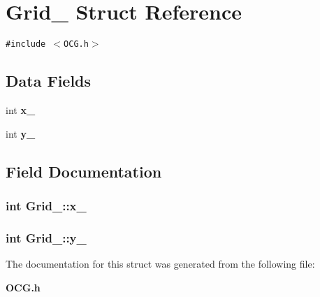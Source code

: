 \section{Grid\_\- Struct Reference}
\label{structGrid__}
{\tt \#include $<$OCG.h$>$}

\subsection*{Data Fields}
\begin{CompactItemize}
\item 
int {\bf x\_\-}
\item 
int {\bf y\_\-}
\end{CompactItemize}


\subsection{Field Documentation}
\subsubsection[{x\_\-}]{\setlength{\rightskip}{0pt plus 5cm}int {\bf Grid\_\-::x\_\-}}\label{structGrid___80334d1c9d8f030f64c329e358c3f4fa}


\subsubsection[{y\_\-}]{\setlength{\rightskip}{0pt plus 5cm}int {\bf Grid\_\-::y\_\-}}\label{structGrid___407372add1e0ad6e881019929cea3796}




The documentation for this struct was generated from the following file:\begin{CompactItemize}
\item 
{\bf OCG.h}\end{CompactItemize}

